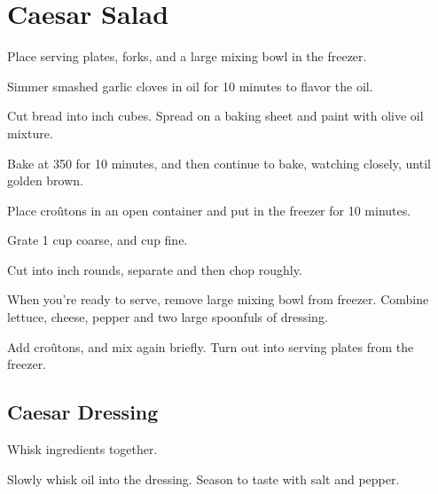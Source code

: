 \section{Caesar Salad}
\begin{recipe}


Place serving plates, forks, and a large mixing bowl in the freezer.


Simmer smashed garlic cloves in oil for 10 minutes to flavor the oil.

Cut bread into  inch cubes. Spread on a baking sheet and paint with olive oil mixture.

Bake at 350\degree{} for 10 minutes, and then continue to bake, watching closely, until golden brown.

Place croûtons in an open container and put in the freezer for 10 minutes.


Grate 1 cup coarse, and  cup fine.


Cut into  inch rounds, separate and then chop roughly.


When you're ready to serve, remove large mixing bowl from freezer. Combine lettuce, cheese, pepper and two large spoonfuls of dressing.

Add croûtons, and mix again briefly. Turn out into serving plates from the freezer.

\subsection{Caesar Dressing}


Whisk ingredients together.


Slowly whisk oil into the dressing. Season to taste with salt and pepper.

\end{recipe}
